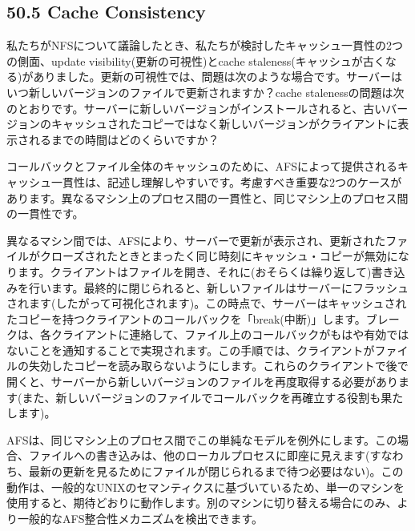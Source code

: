 \hypertarget{cache-consistency}{%
\subsection*{50.5 Cache Consistency}\label{cache-consistency}}

私たちがNFSについて議論したとき、私たちが検討したキャッシュ一貫性の2つの側面、update
visibility(更新の可視性)とcache
staleness(キャッシュが古くなる)がありました。更新の可視性では、問題は次のような場合です。サーバーはいつ新しいバージョンのファイルで更新されますか？cache
stalenessの問題は次のとおりです。サーバーに新しいバージョンがインストールされると、古いバージョンのキャッシュされたコピーではなく新しいバージョンがクライアントに表示されるまでの時間はどのくらいですか？

コールバックとファイル全体のキャッシュのために、AFSによって提供されるキャッシュ一貫性は、記述し理解しやすいです。考慮すべき重要な2つのケースがあります。異なるマシン上のプロセス間の一貫性と、同じマシン上のプロセス間の一貫性です。

異なるマシン間では、AFSにより、サーバーで更新が表示され、更新されたファイルがクローズされたときとまったく同じ時刻にキャッシュ・コピーが無効になります。クライアントはファイルを開き、それに(おそらくは繰り返して)書き込みを行います。最終的に閉じられると、新しいファイルはサーバーにフラッシュされます(したがって可視化されます)。この時点で、サーバーはキャッシュされたコピーを持つクライアントのコールバックを「break(中断)」します。ブレークは、各クライアントに連絡して、ファイル上のコールバックがもはや有効ではないことを通知することで実現されます。この手順では、クライアントがファイルの失効したコピーを読み取らないようにします。これらのクライアントで後で開くと、サーバーから新しいバージョンのファイルを再度取得する必要があります(また、新しいバージョンのファイルでコールバックを再確立する役割も果たします)。

AFSは、同じマシン上のプロセス間でこの単純なモデルを例外にします。この場合、ファイルへの書き込みは、他のローカルプロセスに即座に見えます(すなわち、最新の更新を見るためにファイルが閉じられるまで待つ必要はない)。この動作は、一般的なUNIXのセマンティクスに基づいているため、単一のマシンを使用すると、期待どおりに動作します。別のマシンに切り替える場合にのみ、より一般的なAFS整合性メカニズムを検出できます。


